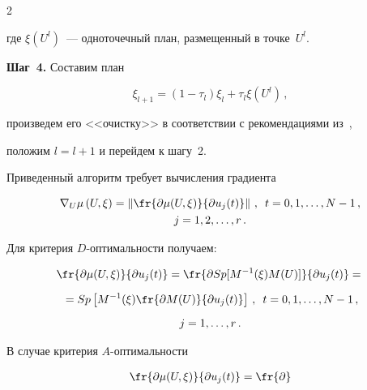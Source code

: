 \begin{multicols}{2}
\begin{equation*}
  \end{equation*}


где $\xi(U^l)$~--- одноточечный план, размещенный в точке~$U^l$.





\smallskip\textbf{Шаг~4.} Составим план


  $$


  \xi_{l+1}=\left (1-\tau_l\right)\xi_l+\tau_l\xi\left(U^l\right)\,,


  $$


произведем его <<очистку>> в соответствии с рекомендациями из~\cite{4-c},


положим $l=l+1$ и перейдем к шагу~2.





  Приведенный алгоритм требует вычисления градиента


  \begin{multline*}


  \nabla_U \mu\left(U,\xi\right) =\left\Vert \fr{\partial\mu(U,\xi)}{\partial


u_j(t)}\right\Vert\,,\enskip t=0,1, \ldots ,N-1\,,\\  j=1,2, \ldots ,r\,.


  \end{multline*}





  Для критерия $D$-опти\-маль\-ности получаем:


  \begin{multline*}


  \fr{\partial\mu(U,\xi)}{\partial u_j(t)} =\fr{\partial


  Sp[M^{-1}(\xi)M(U)]}{\partial u_j(t)}= {}\\[6pt]


  {}=Sp\left[ M^{-1}(\xi)\fr{\partial


M(U)}{\partial u_j(t)}\right]\,, \enskip t=0,1, \ldots ,N-1\,, \\[6pt]


j=1, \ldots ,r\,.


  \end{multline*}





  В случае критерия $A$-опти\-маль\-ности


    \begin{multline*}


  \fr{\partial\mu(U,\xi)}{\partial u_j(t)} =\fr{\partial


}
\end{multline*}
\end{multicols}
